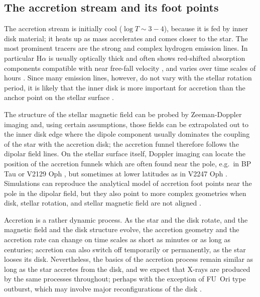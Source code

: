 \subsection{The accretion stream and its foot points}
\label{sect:accretionsrteam}
The accretion stream is initially cool ($\log T\sim3-4$), because it is fed by inner disk material; it heats up as mass accelerates and comes closer to the star. The most prominent tracers are the strong and complex hydrogen emission lines. In particular H$\alpha$ is usually optically thick and often shows red-shifted absorption components compatible with near free-fall velocity \cite[e.g.][]{2000AJ....119.1881A}, and varies over time scales of hours \cite{dupree_2012}. Since many emission lines, however, do not vary with the stellar rotation period, it is likely that the inner disk is more important for accretion than the anchor point on the stellar surface \cite{2021A&A...649A..68S}. 

The structure of the stellar magnetic field can be probed by Zeeman-Doppler imaging and, using certain assumptions, those fields can be extrapolated out to the inner disk edge where the dipole component usually dominates the coupling of the star with the accretion disk; the accretion funnel therefore follows the dipolar field lines. On the stellar surface itself, Doppler imaging can locate the position of the accretion funnels which are often found near the pole, e.g.\ in BP Tau \cite{2008MNRAS.386.1234D} or V2129 Oph \cite{2011A&A...530A...1A}, but sometimes at lower latitudes as in V2247 Oph \cite{2010MNRAS.402.1426D}. 
Simulations can reproduce the analytical model of accretion foot points near the pole in the dipolar field, but they also point to more complex geometries when disk, stellar rotation, and stellar magnetic field are not aligned \cite{2021MNRAS.506..372R}.

Accretion is a rather dynamic process. As the star and the disk rotate, and the magnetic field and the disk structure evolve, the accretion geometry and the accretion rate can change on time scales as short as minutes or as long as centuries; accretion can also switch off temporarily or permanently, as the star looses its disk. Nevertheless, the basics of the  accretion process remain similar as long as the star accretes from the disk, and we expect that X-rays are produced by the same processes throughout; perhaps with the exception of FU~Ori type outburst, which may involve major reconfigurations of the disk \cite{2014prpl.conf..387A}. 


